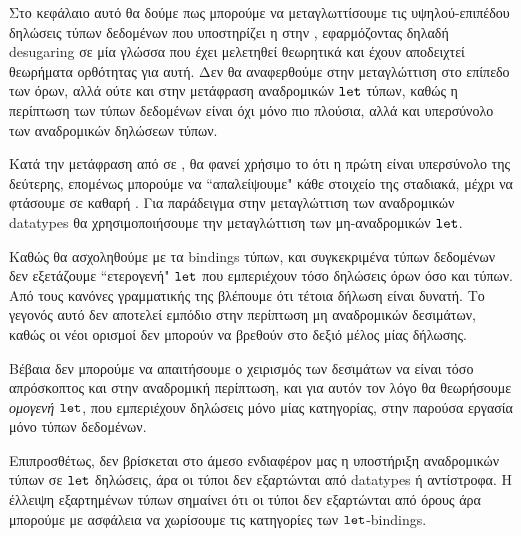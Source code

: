 Στο κεφάλαιο αυτό θα δούμε πως μπορούμε να μεταγλωττίσουμε τις υψηλού-επιπέδου
δηλώσεις τύπων δεδομένων που υποστηρίζει η \FIR{} στην \FOMF, εφαρμόζοντας
δηλαδή desugaring σε μία γλώσσα που έχει μελετηθεί θεωρητικά και έχουν
αποδειχτεί θεωρήματα ορθότητας για αυτή. Δεν θα αναφερθούμε στην μεταγλώττιση
στο επίπεδο των όρων, αλλά ούτε και στην μετάφραση αναδρομικών $\operatorname{\texttt{let}}$ τύπων,
καθώς η περίπτωση των τύπων δεδομένων είναι όχι μόνο πιο πλούσια, αλλά και
υπερσύνολο των αναδρομικών δηλώσεων τύπων.

Κατά την μετάφραση από \FIR{} σε \FOMF{}, θα φανεί χρήσιμο το ότι η πρώτη είναι
υπερσύνολο της δεύτερης, επομένως μπορούμε να ``απαλείψουμε" κάθε στοιχείο της
\FIR{} σταδιακά, μέχρι να φτάσουμε σε καθαρή \FOMF{}. Για παράδειγμα στην
μεταγλώττιση των αναδρομικών datatypes θα χρησιμοποιήσουμε την μεταγλώττιση των
μη-αναδρομικών $\operatorname{\texttt{let}}$.

Καθώς θα ασχοληθούμε με τα bindings τύπων, και συγκεκριμένα τύπων δεδομένων δεν
εξετάζουμε ``ετερογενή" $\operatorname{\texttt{let}}$ που εμπεριέχουν τόσο δηλώσεις όρων όσο και
τύπων. Από τους κανόνες γραμματικής της \FIR{} βλέπουμε ότι τέτοια δήλωση είναι
δυνατή. Το γεγονός αυτό δεν αποτελεί εμπόδιο στην περίπτωση μη αναδρομικών
δεσιμάτων, καθώς οι νέοι ορισμοί δεν μπορούν να βρεθούν στο δεξιό μέλος μίας
δήλωσης.

Βέβαια δεν μπορούμε να απαιτήσουμε ο χειρισμός των δεσιμάτων να είναι τόσο
απρόσκοπτος και στην αναδρομική περίπτωση, και για αυτόν τον λόγο θα θεωρήσουμε
\emph{ομογενή} $\operatorname{\texttt{let}}$, που εμπεριέχουν δηλώσεις μόνο μίας κατηγορίας, στην
παρούσα εργασία μόνο τύπων δεδομένων.

Επιπροσθέτως, δεν βρίσκεται στο άμεσο ενδιαφέρον μας η υποστήριξη αναδρομικών
τύπων σε $\operatorname{\texttt{let}}$ δηλώσεις, άρα οι τύποι δεν εξαρτώνται από datatypes ή
αντίστροφα. Η έλλειψη εξαρτημένων τύπων σημαίνει ότι οι τύποι δεν εξαρτώνται
από όρους άρα μπορούμε με ασφάλεια να χωρίσουμε τις κατηγορίες των
$\operatorname{\texttt{let}}$-bindings.
